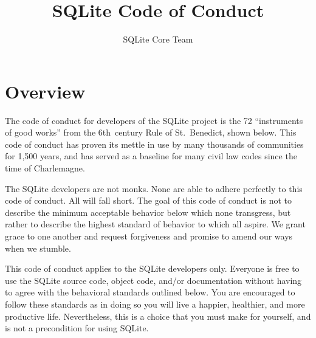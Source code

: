 \documentclass[12pt,letterpaper]{article}
\title{SQLite Code of Conduct}
\author{SQLite Core Team}
\date{}
\begin{document}
\frenchspacing
\maketitle

\section*{Overview}
The code of conduct for developers of the SQLite project is the 72
``instruments of good works'' from the 6th~century Rule of
St.~Benedict, shown below. This code of conduct has proven its mettle
in use by many thousands of communities for 1,500 years, and has
served as a baseline for many civil law codes since the time of
Charlemagne.

The SQLite developers are not monks. None are able to adhere perfectly
to this code of conduct. All will fall short. The goal of this code of
conduct is not to describe the minimum acceptable behavior below which
none transgress, but rather to describe the highest standard of
behavior to which all aspire. We grant grace to one another and
request forgiveness and promise to amend our ways when we stumble.

This code of conduct applies to the SQLite developers only. Everyone
is free to use the SQLite source code, object code, and/or
documentation without having to agree with the behavioral standards
outlined below. You are encouraged to follow these standards as in
doing so you will live a happier, healthier, and more productive
life. Nevertheless, this is a choice that you must make for yourself,
and is not a precondition for using SQLite.
\end{document}
